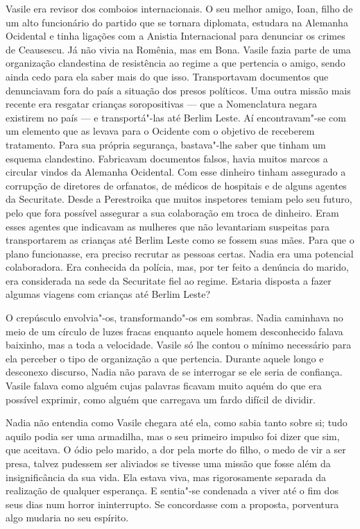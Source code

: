 Vasile era revisor dos comboios internacionais. O seu melhor amigo,
Ioan, filho de um alto funcionário do partido que se tornara
diplomata, estudara na Alemanha Ocidental e tinha ligações com a
Anistia Internacional para denunciar os crimes de Ceausescu. Já não
vivia na Romênia, mas em Bona. Vasile fazia parte de uma organização
clandestina de resistência ao regime a que pertencia o amigo, sendo
ainda cedo para ela saber mais do que isso. Transportavam documentos que
denunciavam fora do país a situação dos presos políticos. Uma outra
missão mais recente era resgatar crianças soropositivas --- que a
Nomenclatura negara existirem no país --- e transportá"-las até Berlim
Leste. Aí encontravam"-se com um elemento que as levava para o Ocidente
com o objetivo de receberem tratamento. Para sua própria segurança,
bastava"-lhe saber que tinham um esquema clandestino. Fabricavam documentos falsos, havia muitos marcos a circular vindos da Alemanha
Ocidental. Com esse dinheiro tinham assegurado a corrupção de
diretores de orfanatos, de médicos de hospitais e de alguns agentes da
Securitate. Desde a Perestroika que muitos inspetores temiam pelo seu
futuro,
pelo que fora possível assegurar a sua colaboração em troca de dinheiro.
Eram esses agentes que indicavam as mulheres que não levantariam
suspeitas para transportarem as crianças até Berlim Leste como se
fossem suas mães. Para que o plano funcionasse, era preciso recrutar as
pessoas certas. Nadia era uma potencial colaboradora. Era conhecida da
polícia, mas, por ter feito a denúncia do marido, era considerada na
sede da Securitate fiel ao regime. Estaria disposta a fazer algumas
viagens com crianças até Berlim Leste?

O crepúsculo envolvia"-os, transformando"-os em sombras. Nadia caminhava
no meio de um círculo de luzes fracas enquanto aquele homem desconhecido
falava baixinho, mas a toda a velocidade. Vasile só lhe contou o mínimo
necessário para ela perceber o tipo de organização a que pertencia.
Durante aquele longo e desconexo discurso, Nadia não parava de se
interrogar se ele seria de confiança. Vasile falava como alguém cujas
palavras ficavam muito aquém do que era possível exprimir, como alguém
que carregava um fardo difícil de dividir.

Nadia não entendia como
Vasile chegara até ela, como sabia tanto sobre si; tudo aquilo podia ser
uma armadilha, mas o seu primeiro impulso foi dizer que sim, que
aceitava. O ódio pelo marido, a dor pela morte do filho, o medo de vir a
ser presa, talvez pudessem ser aliviados se tivesse uma missão que fosse
além da insignificância da sua vida. Ela estava viva, mas rigorosamente
separada da realização de qualquer esperança. E sentia"-se condenada a
viver até o fim dos seus dias num horror ininterrupto. Se concordasse
com a proposta, porventura algo mudaria no seu espírito.

